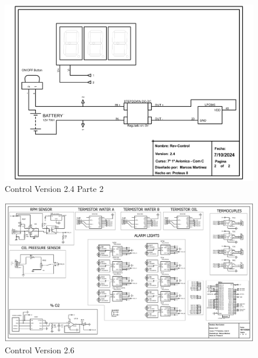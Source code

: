     \begin{landscape}
        \begin{figure}
            \centering
            \includegraphics[angle=270, width=\textwidth, keepaspectratio]{Anexo-A Bloque/Rev- Control Version 2.4 Parte 2.pdf}
            \caption{Control Version 2.4 Parte 2}
            \label{fig:A_1}
        \end{figure}
        
        \newpage
        
        \begin{figure}
            \centering
            \includegraphics[angle=270, width=\textwidth, keepaspectratio]{Anexo-A Bloque/REV-CONTROL version2.6.2.PDF}
            \caption{Control Version 2.6}
            \label{fig:A_2}
        \end{figure}
        
    \end{landscape}